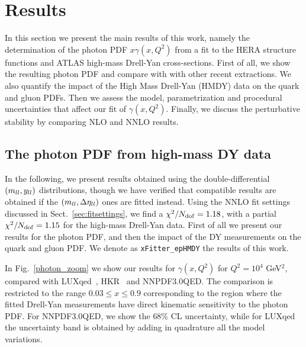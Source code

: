 \section{Results}
\label{sec:results}

In this section we present the main results of this work,
namely the determination
of the photon PDF $x\gamma(x,Q^2)$ from a fit to the HERA structure functions
and ATLAS high-mass Drell-Yan cross-sections.
%
First of all, we show the resulting photon PDF and compare with
with other recent extractions.
%
We also quantify the impact of the High Mass Drell-Yan (HMDY) data on the quark and
gluon PDFs.
%
Then we assess the model, parametrization
and procedural uncertainties that affect our fit of $\gamma(x,Q^2)$.
%
Finally, we discuss the perturbative stability by comparing
NLO and NNLO results.

\subsection{The photon PDF from high-mass DY data}

In the following, we  present results obtained using the
double-differential $\left( m_{ll},y_{ll}\right)$ distributions, though
we have verified that compatible results
are obtained if the $\left( m_{ll},\Delta\eta_{ll}\right)$ ones are fitted
instead.
%
Using the NNLO fit settings discussed in Sect.~\ref{sec:fitsettings}, we find
a $\chi^{2}/N_{\rm dof} = 1.18$,
with a partial $\chi^2/N_{\rm dof} = 1.15$ for the high-mass Drell-Yan data.
%
First of all we present our results for the photon PDF, and then the impact
of the DY measurements on the quark and gluon PDF.
%
We denote as {\tt xFitter\_epHMDY} the results of this work.

In Fig.~\ref{photon_zoom} we show our results
for $\gamma(x,Q^2)$ for $Q^2=10^4$ GeV$^2$,
compared with LUXqed~\cite{Manohar:2016nzj}, HKR~\cite{Harland-Lang:2016apc}
and NNPDF3.0QED.
%
The comparison is restricted to the range $0.03 \le x \le 0.9$ corresponding
to the region where the fitted Drell-Yan measurements have direct kinematic sensitivity
to the photon PDF.
%
For NNPDF3.0QED, we show the 68\% CL uncertainty, while for LUXqed the uncertainty band
is obtained by adding in quadrature all the model variations.

